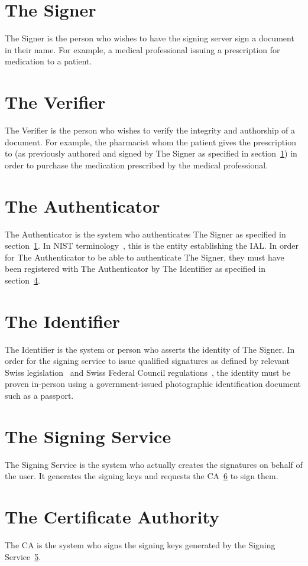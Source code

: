 \section{The Signer}
\label{sec:actorsigner}
The Signer is the person who wishes to have the signing server sign a document in their name.
For example, a medical professional issuing a prescription for medication to a patient.

\section{The Verifier}
\label{sec:actorverifier}
The Verifier is the person who wishes to verify the integrity and authorship of a document.
For example, the pharmacist whom the patient gives the prescription to (as previously authored and signed by The Signer as specified in section~\ref{sec:actorsigner}) in order to purchase the medication prescribed by the medical professional.

\section{The Authenticator}
\label{sec:actorauthenticator}
The Authenticator is the system who authenticates The Signer as specified in section~\ref{sec:actorsigner}.
In \gls{NIST} terminology~\cite{nistdigitalidentityguidelines}, this is the entity establishing the \gls{IAL}.
In order for The Authenticator to be able to authenticate The Signer,
they must have been registered with The Authenticator by The Identifier as specified in section~\ref{sec:authoridentifier}.

\section{The Identifier}
\label{sec:authoridentifier}
The Identifier is the system or person who asserts the identity of The Signer.
In order for the signing service to issue qualified signatures as defined by relevant Swiss legislation~\cite{zertes} and Swiss Federal Council regulations~\cite{vzertes},
the identity must be proven in-person using a government-issued photographic identification document such as a passport.

\section{The Signing Service}
\label{sec:signingservice}
The Signing Service is the system who actually creates the signatures on behalf of the user.
It generates the signing keys and requests the \gls{CA}~\ref{sec:ca} to sign them.

\section{The Certificate Authority}
\label{sec:ca}
The \gls{CA} is the system who signs the signing keys generated by the Signing Service~\ref{sec:signingservice}.
